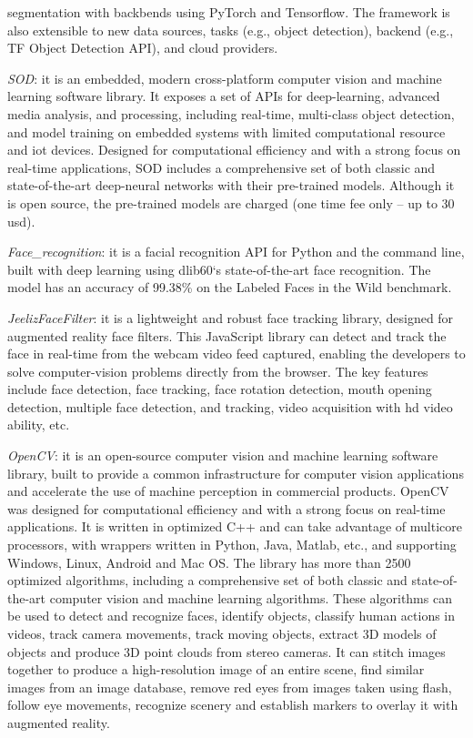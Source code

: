 \begin{enum-c}
segmentation with backbends using PyTorch and Tensorflow.
The framework is also extensible to new data sources, tasks (e.g., object
detection), backend (e.g., TF Object Detection API), and cloud providers.
\item \emph{SOD}:
it is an embedded, modern cross-platform computer vision and machine learning
software library.
It exposes a set of APIs for deep-learning, advanced media analysis, and
processing, including real-time, multi-class object detection, and model
training on embedded systems with limited computational resource and \gls{iot}
devices.
Designed for computational efficiency and with a strong focus on real-time
applications, SOD includes a comprehensive set of both classic and
state-of-the-art deep-neural networks with their pre-trained models.
Although it is open source, the pre-trained models are charged (one time fee
only -- up to 30 \gls{usd}).
\item \emph{Face\_recognition}:
  it is a facial recognition API for Python and the command line, built with
  deep learning using dlib60‘s state-of-the-art face recognition.
  The model has an accuracy of 99.38\% on the Labeled Faces in the Wild
  benchmark.
\item \emph{JeelizFaceFilter}:
it is a lightweight and robust face tracking library, designed for augmented reality face filters.
This JavaScript library can detect and track the face in real-time from the
webcam video feed captured, enabling the developers to solve computer-vision
problems directly from the browser.
The key features include face detection, face tracking, face rotation
detection, mouth opening detection, multiple face detection, and tracking, video
acquisition with \gls{hd} video ability, etc.
\item \emph{OpenCV}:
it is an open-source computer vision and machine learning software library,
built to provide a common infrastructure for computer vision applications and
accelerate the use of machine perception in commercial products.
OpenCV was designed for computational efficiency and with a strong focus on
real-time applications. It is written in optimized C++ and can take advantage of
multicore processors, with wrappers written in Python, Java, Matlab, etc., and
supporting Windows, Linux, Android and Mac OS.
The library has more than 2500 optimized algorithms, including a comprehensive
set of both classic and state-of-the-art computer vision and machine learning algorithms.
These algorithms can be used to detect and recognize faces, identify objects,
classify human actions in videos, track camera movements, track moving objects,
extract 3D models of objects and produce 3D point clouds from stereo cameras.
It can stitch images together to produce a high-resolution image of an entire
scene, find similar images from an image database, remove red eyes from images
taken using flash, follow eye movements, recognize scenery and establish markers to overlay it with augmented reality.
\end{enum-c}
%
%
